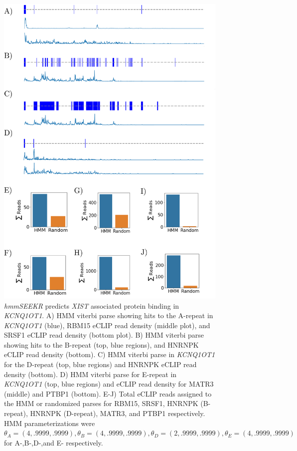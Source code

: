 \begin{figure}[h!]
\centering
\includegraphics[height=.75\textheight]{images/kcneclip.pdf}
\caption[Analysis of HMM and eCLIP data in \emph{KCNQ1OT1}]{\emph{hmmSEEKR} predicts \emph{XIST} associated protein binding in \emph{KCNQ1OT1}. A) HMM viterbi parse showing hits to the A-repeat in \emph{KCNQ1OT1} (blue), RBM15 eCLIP read density (middle plot), and SRSF1 eCLIP read density (bottom plot). B) HMM viterbi parse showing hits to the B-repeat (top, blue regions), and HNRNPK eCLIP read density (bottom). C) HMM viterbi parse in \emph{KCNQ1OT1} for the D-repeat (top, blue regions) and HNRNPK eCLIP read density (bottom). D) HMM viterbi parse for E-repeat in \emph{KCNQ1OT1} (top, blue regions) and eCLIP read density for MATR3 (middle) and PTBP1 (bottom). E-J) Total eCLIP reads assigned to the HMM or randomized parses for RBM15, SRSF1, HNRNPK (B-repeat), HNRNPK (D-repeat), MATR3, and PTBP1 respectively. HMM parameterizations were $\theta_A = (4,.9999,.9999), \theta_B = (4,.9999,.9999), \theta_D = (2,.9999,.9999), \theta_E = (4,.9999,.9999)$ for A-,B-,D-,and E- respectively. }
\label{fig:kcntracks}
\end{figure}

